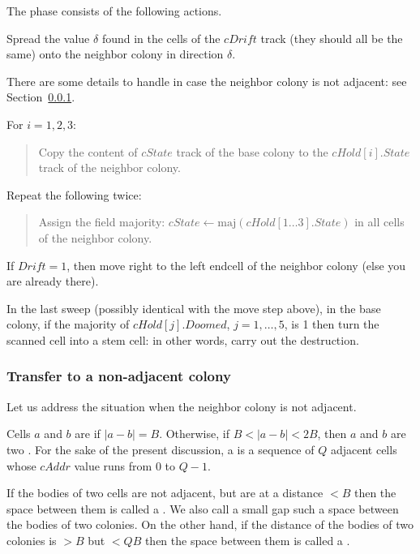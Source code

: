 \documentclass[12pt]{memoir}
\newcommand{\fld}[1]{\ensuremath{\textit{#1}}}
\newcommand{\maj}{\mathrm{maj}}
\def\B{B}
\newcommand{\cAddr}{\fld{cAddr}}
\newcommand{\Drift}{\fld{Drift}}
\newcommand{\Doomed}{\fld{Doomed}}
\newcommand{\cDrift}{\fld{cDrift}}
\newcommand{\cHold}{\fld{cHold}}
\newcommand{\State}{\fld{State}}
\newcommand{\cState}{\fld{cState}}
\begin{document}
The phase consists of the following actions.
\begin{enumerate}[1.]
\item
  Spread the value \( \delta \) found in the cells of the \( \cDrift \) track
  (they should all be the same)
  onto the neighbor colony in direction \( \delta \).

There are some details to handle in case the neighbor colony is not adjacent:
see Section~\ref{sec:adjacency}.

\item\label{i:transfer-state} For \( i=1,2,3 \):
        \begin{quote}
          Copy the content of \( \cState \) track of the base colony
            to the \( \cHold[i].\State \) track of the neighbor colony.
        \end{quote}

\item Repeat the following twice:
  \begin{quote}
 Assign the field majority: \( \cState\gets \maj(\cHold[1 \dots  3].\State) \)
in all cells of the neighbor colony.    
  \end{quote}
  
\item If \( \Drift = 1 \), then move right to the left endcell of the neighbor colony
(else you are already there).

        \begin{sloppypar}
          \item In the last sweep (possibly identical with the move step above), 
            in the base colony, if the majority of \( \cHold[j].\Doomed \), \( j=1,\dots,5 \), 
            is 1 then turn the scanned cell into a stem cell: in other
            words, carry out the destruction.
          \end{sloppypar}


\end{enumerate}

\subsubsection{Transfer to a non-adjacent colony}\label{sec:adjacency}

Let us address the situation when the neighbor colony is not adjacent.

\begin{definition}\label{def:adjacent}
  Cells \( a \) and \( b \) are  if \( |a-b|=\B \).
  Otherwise, if \( \B < | a- b| < 2\B \), then
  \( a \) and \( b \) are two .
For the sake of the present discussion, a  is a sequence of \( Q \) adjacent
cells whose \( \cAddr \) value runs from \( 0 \) to \( Q-1 \).

If the bodies of two cells are not adjacent, but are at a distance \( <\B \) then the space
between them is called a .
We also call a small gap such a space between the bodies of two colonies.
On the other hand, if the distance of the bodies of two colonies is \( >\B \) 
but \( <Q\B \) then the space between them is called a .
\end{definition}
\end{document}
